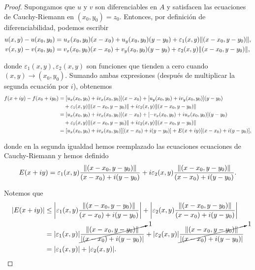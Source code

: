 \begin{proof}
Supongamos que $u$ y $v$ son diferenciables en $A$ y satisfacen las ecuaciones de Cauchy-Riemann en $(x_0,y_0) = z_0$. Entonces, por definición de diferenciabilidad, podemos escribir
\begin{align*}
    u(x,y) - u(x_0,y_0) &= u_x(x_0,y_0) (x-x_0) + u_y(x_0,y_0) (y-y_0) + \varepsilon_1(x,y) \lVert(x-x_0,y-y_0)\rVert, \\
    v(x,y) - v(x_0,y_0) &= v_x(x_0,y_0) (x-x_0) + v_y(x_0,y_0) (y-y_0) + \varepsilon_2(x,y) \lVert(x-x_0,y-y_0)\rVert,
\end{align*}

donde $\varepsilon_1(x,y), \varepsilon_2(x,y)$ son funciones que tienden a cero cuando $(x,y) \to (x_0,y_0)$. Sumando ambas expresiones (después de multiplicar la segunda ecuación por $i$), obtenemos
\begin{align*}
    f(x+iy) - f(x_0 + iy_0) &= [u_x(x_0,y_0) + i v_x(x_0,y_0)] (x-x_0) +  [u_y(x_0,y_0) + i v_y(x_0,y_0)] (y-y_0) \\
    &\quad + \varepsilon_1(x,y)  \lVert(x-x_0,y-y_0)\rVert + i \varepsilon_2(x,y)  \lVert(x-x_0,y-y_0)\rVert \\
    &= [u_x(x_0,y_0) + i v_x(x_0,y_0)] (x-x_0) +  [-v_x(x_0,y_0) + i u_x(x_0,y_0)] (y-y_0) \\
    &\quad + \varepsilon_1(x,y)  \lVert(x-x_0,y-y_0)\rVert + i \varepsilon_2(x,y)  \lVert(x-x_0,y-y_0)\rVert \\
    &=  [u_x(x_0,y_0) + i v_x(x_0,y_0)] [(x-x_0) + i (y-y_0)] + E(x+iy) [(x-x_0) + i(y-y_0)],
\end{align*}

donde en la segunda igualdad hemos reemplazado las ecuaciones ecuaciones de Cauchy-Riemann y hemos definido
$$E(x+iy) = \varepsilon_1(x,y) \frac{\lVert(x-x_0,y-y_0)\rVert}{(x-x_0) + i(y-y_0)} + i \varepsilon_2(x,y)  \frac{\lVert(x-x_0,y-y_0)\rVert}{(x-x_0) + i(y-y_0)}.$$

Notemos que 
\begin{align*}
    |E(x+iy)| &\leq \left| \varepsilon_1(x,y) \frac{\lVert(x-x_0,y-y_0)\rVert}{(x-x_0) + i(y-y_0)} \right| +  \left| \varepsilon_2(x,y) \frac{\lVert(x-x_0,y-y_0)\rVert}{(x-x_0) + i(y-y_0)} \right| \\
    &= | \varepsilon_1(x,y)| \cancelto{1}{\frac{\lVert(x-x_0,y-y_0)\rVert}{|(x-x_0) + i(y-y_0)|}} +   | \varepsilon_2(x,y)| \cancelto{1}{\frac{\lVert(x-x_0,y-y_0)\rVert}{|(x-x_0) + i(y-y_0)|}} \\
    &= |\varepsilon_1(x,y)| + |\varepsilon_2(x,y)|.
\end{align*}


\end{proof}
